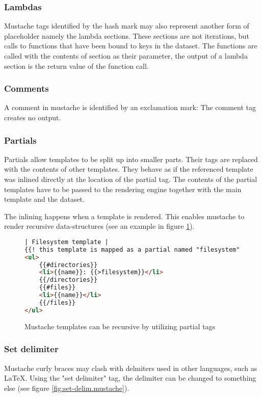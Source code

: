 \documentclass[thesis.tex]{subfiles}
\begin{document}
\subsubsection{Lambdas}
Mustache tags identified by the hash mark may also represent another form of
placeholder namely the lambda sections. These sections are not iterations, but
calls to functions that have been bound to keys in the dataset.
The functions are called with the contents of section as their parameter, the
output of a lambda section is the return value of the function call.

\subsubsection{Comments}
A comment in mustache is identified by an exclamation mark:
The comment tag creates no output.

\subsubsection{Partials}
Partials allow templates to be split up into smaller parts. Their tags are
replaced with the contents of other templates. They behave as if the referenced
template was inlined directly at the location of the partial tag.
The contents of the partial templates have to be passed to the rendering engine
together with the main template and the dataset.

The inlining happens when a template is rendered. This enables mustache to
render recursive data-structures
(see an example in figure \ref{fig:partial.mustache}).
\begin{figure}
	\centering
	\caption{Mustache templates can be recursive by utilizing partial tags}
	\label{fig:partial.mustache}
	\begin{lstlisting}[language=HTML]
| Filesystem template |
{{! this template is mapped as a partial named "filesystem" }}
<ul>
	{{#directories}}
	<li>{{name}}: {{>filesystem}}</li>
	{{/directories}}
	{{#files}}
	<li>{{name}}</li>
	{{/files}}
</ul>
	\end{lstlisting}
\end{figure}

\subsubsection{Set delimiter}
Mustache curly braces may clash with delmiters used in other languages,
such as LaTeX. Using the "set delimiter" tag, the delimiter can be changed to
something else (see figure \ref{fig:set-delim.mustache}).
\end{document}
